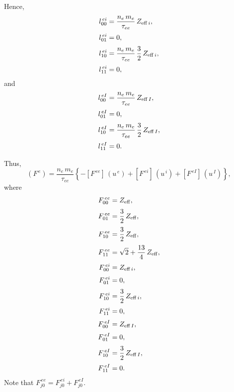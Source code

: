 \documentclass[notitlepage,12pt]{article}
\begin{document}
Hence,
\begin{align}
l^{\,ei}_{00} &= \frac{n_e\,m_e}{\tau_{ee}}\,Z_{{\rm eff}\,i},\\[0.5ex]
l^{\,ei}_{01}&= 0,\\[0.5ex]
l^{\,ei}_{10}&= \frac{n_e\,m_e}{\tau_{ee}}\,\frac{3}{2}\,Z_{{\rm eff}\,i},\\[0.5ex]
l^{\,ei}_{11}& = 0,
\end{align}
and
\begin{align}
l^{\,eI}_{00} &= \frac{n_e\,m_e}{\tau_{ee}}\,Z_{{\rm eff}\,I},\\[0.5ex]
l^{\,eI}_{01}&= 0,\\[0.5ex]
l^{\,eI}_{10}&= \frac{n_e\,m_e}{\tau_{ee}}\,\frac{3}{2}\,Z_{{\rm eff}\,I},\\[0.5ex]
l^{\,eI}_{11}& = 0.
\end{align}

Thus, 
\begin{equation}
(F^{\,e})= \frac{n_e\,m_e}{\tau_{ee}}\left\{-\left[F^{\,ee}\right]\,(u^{\,e})+\left[F^{\,ei}\right]\,(u^{\,i}) +\left[F^{\,eI}\right]\,(u^{\,I}) \right\},
\end{equation}
where
\begin{align}
F^{\,ee}_{00} &= Z_{\rm eff},\\[0.5ex]
F^{\,ee}_{01} &= \frac{3}{2}\,Z_{\rm eff},\\[0.5ex]
F^{\,ee}_{10} &= \frac{3}{2}\,Z_{\rm eff},\\[0.5ex]
F^{\,ee}_{11} &= \sqrt{2} + \frac{13}{4}\,Z_{\rm eff},\\[0.5ex]
F^{\,ei}_{00} &= Z_{{\rm eff}\,i},\\[0.5ex]
F^{\,ei}_{01} &= 0,\\[0.5ex]
F^{\,ei}_{10} &= \frac{3}{2}\,Z_{{\rm eff}\,i},\\[0.5ex]
F^{\,ei}_{11} &= 0,\\[0.5ex]
F^{\,eI}_{00} &= Z_{{\rm eff}\,I},\\[0.5ex]
F^{\,eI}_{01} &= 0,\\[0.5ex]
F^{\,eI}_{10} &= \frac{3}{2}\,Z_{{\rm eff}\,I},\\[0.5ex]
F^{\,eI}_{11} &= 0.
\end{align}
Note that $F^{\,ee}_{j0}= F^{\,ei}_{j0} + F^{\,eI}_{j0}$. 
\end{document}
